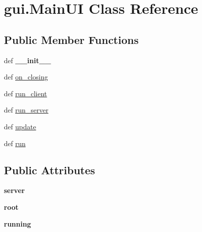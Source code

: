 \hypertarget{classgui_1_1_main_u_i}{\section{gui.\-Main\-U\-I \-Class \-Reference}
\label{classgui_1_1_main_u_i}
}
\subsection*{\-Public \-Member \-Functions}
\begin{DoxyCompactItemize}
\item 
\hypertarget{classgui_1_1_main_u_i_a3148903050d866035c6e7d688731255c}{def {\bfseries \-\_\-\-\_\-init\-\_\-\-\_\-}}\label{classgui_1_1_main_u_i_a3148903050d866035c6e7d688731255c}

\item 
def \hyperlink{classgui_1_1_main_u_i_a1259307b27eece9db745beaaa5a37e6c}{on\-\_\-closing}
\item 
def \hyperlink{classgui_1_1_main_u_i_ae13781889a6f42dea249544e596fed19}{run\-\_\-client}
\item 
def \hyperlink{classgui_1_1_main_u_i_ad10b39aecff1ba8ddd5a1bcef8a75bd3}{run\-\_\-server}
\item 
def \hyperlink{classgui_1_1_main_u_i_a781b7706ae4447b70deb9756436314f8}{update}
\item 
def \hyperlink{classgui_1_1_main_u_i_a890e42811c6bc7cbce745393faee418a}{run}
\end{DoxyCompactItemize}
\subsection*{\-Public \-Attributes}
\begin{DoxyCompactItemize}
\item 
\hypertarget{classgui_1_1_main_u_i_ac9261ff3d3ccd2993bd230e811f14e78}{{\bfseries server}}\label{classgui_1_1_main_u_i_ac9261ff3d3ccd2993bd230e811f14e78}

\item 
\hypertarget{classgui_1_1_main_u_i_a7eaef8b10442a9b2faaa0f407f251248}{{\bfseries root}}\label{classgui_1_1_main_u_i_a7eaef8b10442a9b2faaa0f407f251248}

\item 
\hypertarget{classgui_1_1_main_u_i_a04f8d5ad38b2c506e5c694c5ba9920c1}{{\bfseries running}}\label{classgui_1_1_main_u_i_a04f8d5ad38b2c506e5c694c5ba9920c1}

\end{DoxyCompactItemize}


